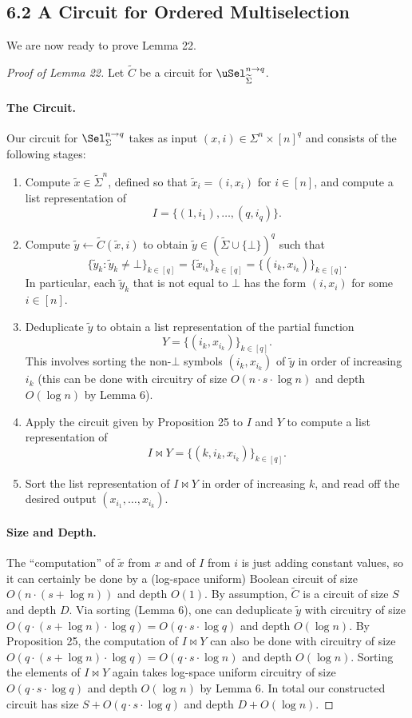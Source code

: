 \subsection*{6.2 A Circuit for Ordered Multiselection}
We are now ready to prove Lemma 22.
\begin{proof}[Proof of Lemma 22]
Let $\widetilde C$ be a circuit for $\uSel_{\widetilde\Sigma}^{n\to q}$.
\paragraph{The Circuit.} Our circuit for $\Sel_\Sigma^{n\to q}$ takes as input $(x,i)\in\Sigma^n\times[n]^q$ and consists of the following stages:
\begin{enumerate}
\item Compute $\widetilde x\in\widetilde\Sigma^n$, defined so that $\widetilde x_i=(i,x_i)$ for $i\in[n]$, and compute a list representation of
\[I=\{(1,i_1),\ldots,(q,i_q)\}.\]
\item Compute $\widetilde y\leftarrow\widetilde C(\widetilde x,i)$ to obtain $\widetilde y\in(\widetilde\Sigma\cup\{\bot\})^q$ such that
\[\{\widetilde y_k:\widetilde y_k\ne\bot\}_{k\in[q]}=\{\widetilde x_{i_k}\}_{k\in[q]}=\{(i_k,x_{i_k})\}_{k\in[q]}.\]
In particular, each $\widetilde y_k$ that is not equal to $\bot$ has the form $(i,x_i)$ for some $i\in[n]$.
\item Deduplicate $\widetilde y$ to obtain a list representation of the partial function
\[Y=\{(i_k,x_{i_k})\}_{k\in[q]}.\]
This involves sorting the non-$\bot$ symbols $(i_k,x_{i_k})$ of $\widetilde y$ in order of increasing $i_k$ (this can be done with circuitry of size $O(n\cdot s\cdot\log n)$ and depth $O(\log n)$ by Lemma 6).
\item Apply the circuit given by Proposition 25 to $I$ and $Y$ to compute a list representation of
\[I\bowtie Y=\{(k,i_k,x_{i_k})\}_{k\in[q]}.\]
\item Sort the list representation of $I\bowtie Y$ in order of increasing $k$, and read off the desired output $(x_{i_1},\ldots,x_{i_k})$.
\end{enumerate}
\paragraph{Size and Depth.} The ``computation'' of $\widetilde x$ from $x$ and of $I$ from $i$ is just adding constant values, so it can certainly be done by a (log-space uniform) Boolean circuit of size $O(n\cdot(s+\log n))$ and depth $O(1)$.
By assumption, $\widetilde C$ is a circuit of size $S$ and depth $D$.
Via sorting (Lemma 6), one can deduplicate $\widetilde y$ with circuitry of size $O(q\cdot(s+\log n)\cdot\log q)=O(q\cdot s\cdot\log q)$ and depth $O(\log n)$.
By Proposition 25, the computation of $I\bowtie Y$ can also be done with circuitry of size $O(q\cdot(s+\log n)\cdot\log q)=O(q\cdot s\cdot\log n)$ and depth $O(\log n)$.
Sorting the elements of $I\bowtie Y$ again takes log-space uniform circuitry of size $O(q\cdot s\cdot\log q)$ and depth $O(\log n)$ by Lemma 6.
In total our constructed circuit has size $S+O(q\cdot s\cdot\log q)$ and depth $D+O(\log n)$.
\end{proof}
